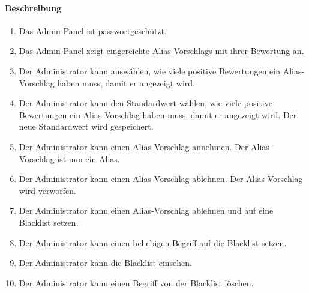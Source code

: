\paragraph{Beschreibung}
\begin{enumerate}[start=100, label=\textbf{/FA\arabic*/}, align=left]
    \item Das \Gls{Admin-Panel} ist passwortgeschützt.
    \item Das \Gls{Admin-Panel} zeigt eingereichte \Glspl{Alias-Vorschlag} mit ihrer Bewertung an.
    \item Der \Gls{Administrator} kann auswählen, wie viele positive Bewertungen ein \Gls{Alias-Vorschlag} haben muss, damit er angezeigt wird.
    \item Der \Gls{Administrator} kann den Standardwert wählen, wie viele positive Bewertungen ein \Gls{Alias-Vorschlag} haben muss, damit er angezeigt wird. Der neue Standardwert wird gespeichert.
    \item Der \Gls{Administrator} kann einen \Gls{Alias-Vorschlag} annehmen. Der \Gls{Alias-Vorschlag} ist nun ein \Gls{Alias}.
    \item Der \Gls{Administrator} kann einen \Gls{Alias-Vorschlag} ablehnen. Der \Gls{Alias-Vorschlag} wird verworfen.
    \item Der \Gls{Administrator} kann einen \Gls{Alias-Vorschlag} ablehnen und auf eine \Gls{Blacklist} setzen.
    \item Der \Gls{Administrator} kann einen beliebigen Begriff auf die \Gls{Blacklist} setzen.
    \item Der \Gls{Administrator} kann die \Gls{Blacklist} einsehen.
    \item Der \Gls{Administrator} kann einen Begriff von der \Gls{Blacklist} löschen.
\end{enumerate}